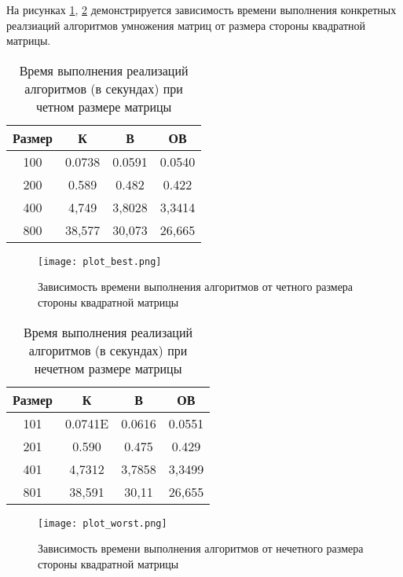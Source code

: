 На рисунках \ref{img:plot_best}, \ref{img:plot_worst} демонстрируется зависимость времени выполнения конкретных реалзиаций алгоритмов умножения матриц от размера стороны квадратной матрицы. \\

\begin{table}[ht]
    \caption{\centering Время выполнения реализаций алгоритмов (в секундах) при четном размере матрицы}
    \centering
    \begin{tabular}{|c|c|c|c|}
    \hline
    Размер & К      & В      & ОВ     \\ \hline
    100    & 0.0738 & 0.0591 & 0.0540 \\ \hline
    200    & 0.589  & 0.482  & 0.422  \\ \hline
    400    & 4,749  & 3,8028 & 3,3414 \\ \hline
    800    & 38,577 & 30,073 & 26,665 \\ \hline
    \end{tabular}
    \label{tab:time_best}
\end{table}

\begin{figure}
    \centering
    \texttt{[image: plot\_best.png]}
    \caption{Зависимость времени выполнения алгоритмов от четного размера стороны квадратной матрицы}
    \label{img:plot_best}
\end{figure}

\begin{table}[p]
    \caption{\centering Время выполнения реализаций алгоритмов (в секундах) при нечетном размере матрицы}
    \centering
    \begin{tabular}{|c|c|c|c|}
    \hline
    Размер & К       & В      & ОВ     \\ \hline
    101    & 0.0741E & 0.0616 & 0.0551 \\ \hline
    201    & 0.590   & 0.475  & 0.429  \\ \hline
    401    & 4,7312  & 3,7858 & 3,3499 \\ \hline
    801    & 38,591  & 30,11  & 26,655 \\ \hline
    \end{tabular}
    \label{tab:time_worst}
\end{table}

\begin{figure}
    \centering
    \texttt{[image: plot\_worst.png]}
    \caption{Зависимость времени выполнения алгоритмов от нечетного размера стороны квадратной матрицы}
    \label{img:plot_worst}
\end{figure}

